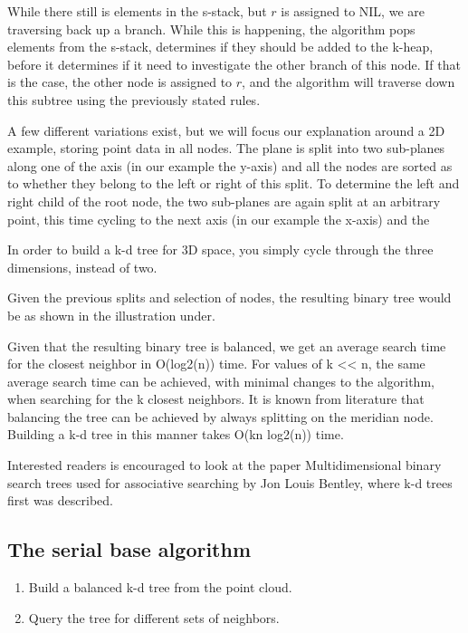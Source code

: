 While there still is elements in the s-stack, but $r$ is assigned to NIL, we are traversing back up a branch. While this is happening, the algorithm pops elements from the s-stack, determines if they should be added to the k-heap, before it determines if it need to investigate the other branch of this node. If that is the case, the other node is assigned to $r$, and the algorithm will traverse down this subtree using the previously stated rules.






A few different variations exist, but we will focus our explanation around a 2D example, storing point data in all nodes. The plane is split into two sub-planes along one of the axis (in our example the y-axis) and all the nodes are sorted as to whether they belong to the left or right of this split. To determine the left and right child of the root node, the two sub-planes are again split at an arbitrary point, this time cycling to the next axis (in our example the x-axis) and the

In order to build a k-d tree for 3D space, you simply cycle through the three dimensions, instead of two.

Given the previous splits and selection of nodes, the resulting binary tree would be as shown in the illustration under.

Given that the resulting binary tree is balanced, we get an average search time for the closest neighbor in O(log2(n)) time. For values of k << n, the same average search time can be achieved, with minimal changes to the algorithm, when searching for the k closest neighbors. It is known from literature that balancing the tree can be achieved by always splitting on the meridian node. Building a k-d tree in this manner takes O(kn log2(n)) time.

Interested readers is encouraged to look at the paper Multidimensional binary search trees used for associative searching by Jon Louis Bentley, where k-d trees first was described.


\subsection{The serial base algorithm} %
\label{ssub:the_serial_base_algorithm}

\begin{enumerate}
    \item Build a balanced k-d tree from the point cloud.
    \item Query the tree for different sets of neighbors.
\end{enumerate}

